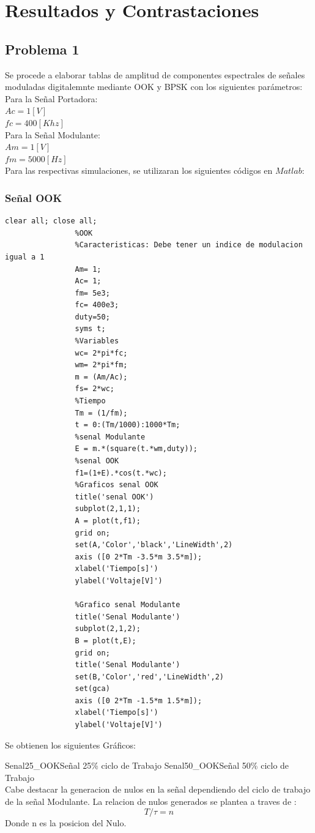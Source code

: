 \documentclass[letterpaper, titlepage]{article}
\begin{document}
\section{Resultados y Contrastaciones}
	
	\subsection{Problema 1}
		Se procede a elaborar tablas de amplitud de componentes espectrales de señales moduladas digitalemnte mediante OOK y BPSK con los siguientes parámetros:\\
		Para la Señal Portadora:\\
		$Ac=1[V]$\\
		$fc=400[Khz]$\\
		Para la Señal Modulante:\\
		$Am=1[V]$\\
		$fm=5000[Hz]$\\
		Para las respectivas simulaciones, se utilizaran los siguientes códigos en $Matlab$:\\
		\subsubsection{Señal OOK}

			\begin{lstlisting}[label=some-code,caption=Codigo Matlab OOK]
				clear all; close all;
				%OOK
				%Caracteristicas: Debe tener un indice de modulacion igual a 1
				Am= 1;
				Ac= 1;
				fm= 5e3; 
				fc= 400e3;
				duty=50;
				syms t;
				%Variables
				wc= 2*pi*fc;
				wm= 2*pi*fm;
				m = (Am/Ac);
				fs= 2*wc;
				%Tiempo
				Tm = (1/fm);
				t = 0:(Tm/1000):1000*Tm;
				%senal Modulante
				E = m.*(square(t.*wm,duty));
				%senal OOK
				f1=(1+E).*cos(t.*wc);
				%Graficos senal OOK
				title('senal OOK')
				subplot(2,1,1);
				A = plot(t,f1);
				grid on;
				set(A,'Color','black','LineWidth',2)
				axis ([0 2*Tm -3.5*m 3.5*m]);
				xlabel('Tiempo[s]')
				ylabel('Voltaje[V]')

				%Grafico senal Modulante
				title('Senal Modulante')
				subplot(2,1,2);
				B = plot(t,E);
				grid on;
				title('Senal Modulante')
				set(B,'Color','red','LineWidth',2)
				set(gca)
				axis ([0 2*Tm -1.5*m 1.5*m]);
				xlabel('Tiempo[s]')
				ylabel('Voltaje[V]')
			\end{lstlisting}
			\newpage
			Se obtienen los siguientes Gráficos:

			{Senal25_OOK}{\label{fig:sim}}{Señal 25\% ciclo de Trabajo}
			{Senal50_OOK}{\label{fig:sim}}{Señal 50\% ciclo de Trabajo}
			\\
			Cabe destacar la generacion de nulos en la señal dependiendo del ciclo de trabajo de la señal Modulante. La relacion de nulos generados se plantea a traves de :
			\begin{equation}
				T/\tau =n
			\end{equation}
			Donde n es la posicion del Nulo.\\\\
	
\end{document}
